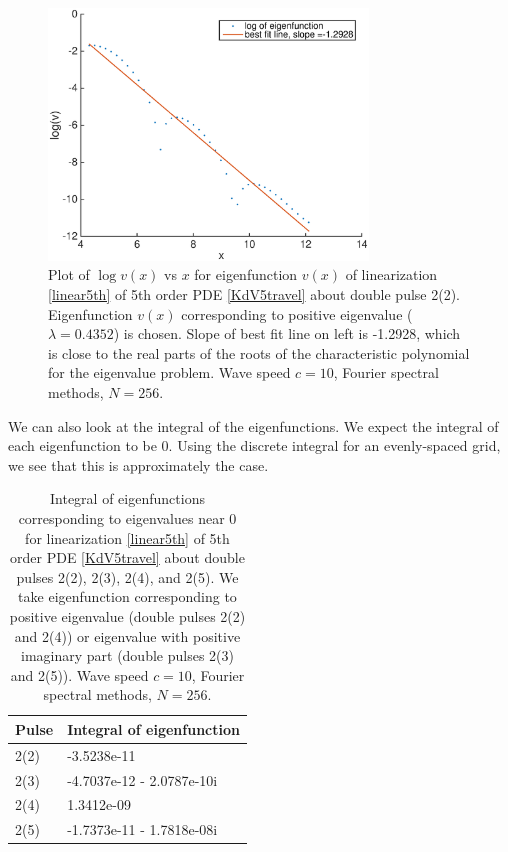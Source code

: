\documentclass[12pt]{article}
\begin{document}
\begin{figure}[H]
	\includegraphics[width=8.5cm]{decayeigenfunction}
	\caption{Plot of $\log v(x)$ vs $x$ for eigenfunction $v(x)$ of linearization \eqref{linear5th} of 5th order PDE \eqref{KdV5travel} about double pulse 2(2). Eigenfunction $v(x)$ corresponding to positive eigenvalue ($\lambda = 0.4352$) is chosen. Slope of best fit line on left is -1.2928, which is close to the real parts of the roots of the characteristic polynomial for the eigenvalue problem. Wave speed $c = 10$, Fourier spectral methods, $N = 256$.}
\end{figure}

We can also look at the integral of the eigenfunctions. We expect the integral of each eigenfunction to be 0. Using the discrete integral for an evenly-spaced grid, we see that this is approximately the case.

\begin{table}[H]
\begin{tabular}{l|l}
Pulse  & Integral of eigenfunction \\ \hline
2(2)   & -3.5238e-11   \\
2(3)   & -4.7037e-12 - 2.0787e-10i  \\
2(4)   & 1.3412e-09  \\
2(5)   & -1.7373e-11 - 1.7818e-08i  \\
\end{tabular}
\caption{Integral of eigenfunctions corresponding to eigenvalues near 0 for linearization \eqref{linear5th} of 5th order PDE \eqref{KdV5travel} about double pulses 2(2), 2(3), 2(4), and 2(5). We take eigenfunction corresponding to positive eigenvalue (double pulses 2(2) and 2(4)) or eigenvalue with positive imaginary part (double pulses 2(3) and 2(5)). Wave speed $c = 10$, Fourier spectral methods, $N = 256$.}
\end{table}
\end{document}
